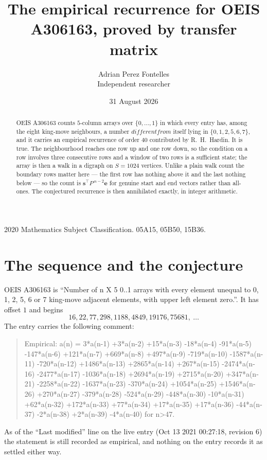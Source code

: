 \documentclass[11pt,a4paper]{article}
\title{The empirical recurrence for OEIS A306163, proved by transfer matrix}
\author{Adrian Perez Fontelles\\ \small Independent researcher}
\date{31 August 2026}
\theoremstyle{plain}
\theoremstyle{definition}
\begin{document}
\maketitle

\begin{abstract}
OEIS A306163 counts $5$-column arrays over $\{0,\dots,1\}$ in which every entry has,
among the eight king-move neighbours, a number $different from$ itself lying in $\{0,1,2,5,6,7\}$, and it carries an empirical
recurrence of order $40$ contributed by R.~H.~Hardin. It is true. The neighbourhood
reaches one row up and one row down, so the condition on a row involves three consecutive
rows and a window of two rows is a sufficient state; the array is then a walk in a digraph
on $S=1024$ vertices. Unlike a plain walk count the boundary rows matter here --- the first
row has nothing above it and the last nothing below --- so the count is
$\mathbf{s}^{\!\top}P^{\,n-2}\mathbf{e}$ for genuine start and end vectors rather than
all-ones. The conjectured recurrence is then annihilated exactly, in integer arithmetic.
\end{abstract}

\noindent\small 2020 Mathematics Subject Classification. 05A15, 05B50, 15B36.\normalsize

\section{The sequence and the conjecture}

OEIS A306163 is ``Number of n X 5 0..1 arrays with every element unequal to 0, 1, 2, 5, 6 or 7 king-move adjacent elements, with upper left element zero.''. It has offset
$1$ and begins
\[
16, 22, 77, 298, 1188, 4849, 19176, 75681,\ \dots
\]
The entry carries the following comment:
\begin{quote}\small
Empirical: a(n) = 3*a(n-1) +3*a(n-2) +15*a(n-3) -18*a(n-4) -91*a(n-5) -147*a(n-6) +121*a(n-7) +669*a(n-8) +497*a(n-9) -719*a(n-10) -1587*a(n-11) -720*a(n-12) +1486*a(n-13) +2865*a(n-14) +267*a(n-15) -2474*a(n-16) -2477*a(n-17) -1036*a(n-18) +2694*a(n-19) +2715*a(n-20) +347*a(n-21) -2258*a(n-22) -1637*a(n-23) -370*a(n-24) +1054*a(n-25) +1546*a(n-26) +270*a(n-27) -379*a(n-28) -524*a(n-29) -448*a(n-30) -10*a(n-31) +62*a(n-32) +172*a(n-33) +77*a(n-34) +17*a(n-35) +17*a(n-36) -44*a(n-37) -2*a(n-38) +2*a(n-39) -4*a(n-40) for n>47.
\end{quote}
As of the ``Last modified'' line on the live entry (Oct 13 2021 00:27:18, revision
6) the statement is still recorded as empirical, and nothing on the entry
records it as settled either way.
\end{document}
